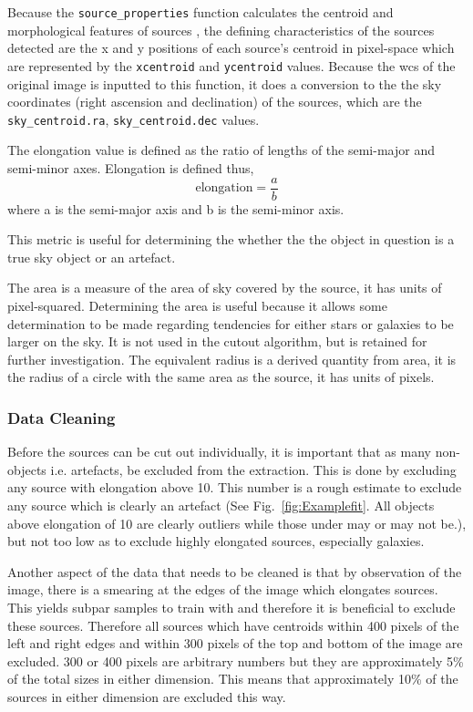 \documentclass[a4paper,fleqn,usenatbib]{mnras}
\begin{document}
Because the \texttt{source\_properties} function calculates the centroid and morphological features of sources \cite{sourceproperties}, the defining characteristics of the sources detected are the x and y positions of each source's centroid in pixel-space which are represented by the \texttt{xcentroid} and \texttt{ycentroid} values. Because the wcs of the original image is inputted to this function, it does a conversion to the the sky coordinates (right ascension and declination) of the sources, which are the \texttt{sky\_centroid.ra}, \texttt{sky\_centroid.dec} values. 

The elongation value is defined as the ratio of lengths of the semi-major and semi-minor axes. Elongation is defined thus,
\begin{equation}
\textrm{elongation} = 	\frac{a}{b}
\end{equation}
where a is the semi-major axis and b is the semi-minor axis.


 This metric is useful for determining the whether the the object in question is a true sky object or an artefact. 

The area is a measure of the area of sky covered by the source, it has units of pixel-squared. Determining the area is useful because it allows some determination to be made regarding tendencies for either stars or galaxies to be larger on the sky. It is not used in the cutout algorithm, but is retained for further investigation. The equivalent radius is a derived quantity from area, it is the radius of a circle with the same area as the source, it has units of pixels. 





\subsubsection{Data Cleaning}
Before the sources can be cut out individually, it is important that as many non-objects i.e. artefacts, be excluded from the extraction. This is done by excluding any source with elongation above 10. This number is a rough estimate to exclude any source which is clearly an artefact (See Fig.~\ref{fig:Examplefit}. All objects above elongation of 10 are clearly outliers while those under may or may not be.), but not too low as to exclude highly elongated sources, especially galaxies. 

Another aspect of the data that needs to be cleaned is that by observation of the image, there is a smearing at the edges of the image which elongates sources. This yields subpar samples to train with and therefore it is beneficial to exclude these sources. Therefore all sources which have centroids within 400 pixels of the left and right edges and within 300 pixels of the top and bottom of the image are excluded. 300 or 400 pixels are arbitrary numbers but they are approximately 5\% of the total sizes in either dimension. This means that approximately 10\% of the sources in either dimension are excluded this way. 
\end{document}
